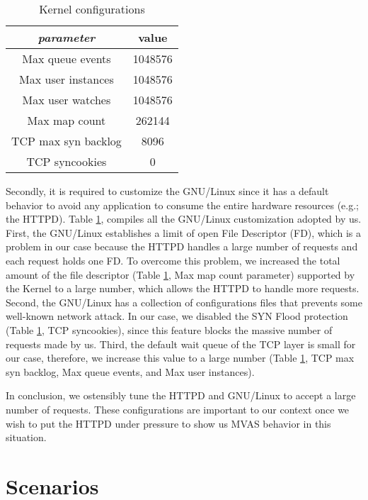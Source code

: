 \begin{table}
  \centering
  \begin{tabular}{|c|c|}
    \hline
    \textit{parameter} & \textbf{value}\\
    \hline
    Max queue events & 1048576\\
    \hline
    Max user instances & 1048576\\
    \hline
    Max user watches & 1048576\\
    \hline
    Max map count & 262144\\
    \hline
    TCP max syn backlog & 8096\\
    \hline
    TCP syncookies & 0\\
    \hline
  \end{tabular}
  \caption{Kernel configurations}
  \label{tab:kernel_config}
\end{table}

Secondly, it is required to customize the GNU/Linux since it has a default
behavior to avoid any application to consume the entire hardware resources
(e.g.; the HTTPD). Table \ref{tab:kernel_config}, compiles all the GNU/Linux
customization adopted by us. First, the GNU/Linux establishes a limit of open
File Descriptor (FD), which is a problem in our case because the HTTPD handles
a large number of requests and each request holds one FD. To overcome this
problem, we increased the total amount of the file descriptor (Table
\ref{tab:kernel_config}, Max map count parameter) supported by the Kernel to a
large number, which allows the HTTPD to handle more requests. Second, the
GNU/Linux has a collection of configurations files that prevents some
well-known network attack. In our case, we disabled the SYN Flood protection
(Table \ref{tab:kernel_config}, TCP syncookies), since this feature blocks the
massive number of requests made by us. Third, the default wait queue of the TCP
layer is small for our case, therefore, we increase this value to a large
number (Table \ref{tab:kernel_config}, TCP max syn backlog, Max queue events,
and Max user instances).

In conclusion, we ostensibly tune the HTTPD and GNU/Linux to accept a large
number of requests. These configurations are important to our context once we
wish to put the HTTPD under pressure to show us MVAS behavior in this
situation.

\section{Scenarios}

